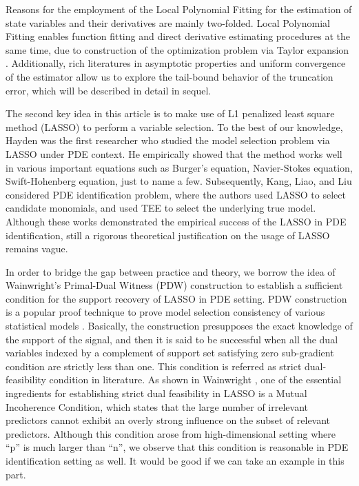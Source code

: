 \documentclass[a4paper,11pt]{article}
\begin{document}
Reasons for the employment of the Local Polynomial Fitting for the estimation of state variables and their derivatives are mainly two-folded. Local Polynomial Fitting enables function fitting and direct derivative estimating procedures at the same time, due to construction of the optimization problem via Taylor expansion \cite{fan1997local}. Additionally, rich literatures in asymptotic properties and uniform convergence of the estimator \cite{fan1997local,tusnady1977remark,mack1982weak} allow us to explore the tail-bound behavior of the truncation error, which will be described in detail in sequel. 

The second key idea in this article is to make use of L1 penalized least square method (LASSO) to perform a variable selection. To the best of our knowledge, Hayden \cite{schaeffer2017learning} was the first researcher who studied the model selection problem via LASSO under PDE context. He empirically showed that the method works well in various important equations such as Burger’s equation, Navier-Stokes equation, Swift-Hohenberg equation, just to name a few. Subsequently, Kang, Liao, and Liu \cite{kang2019ident} considered PDE identification problem, where the authors used LASSO to select candidate monomials, and used TEE to select the underlying true model. Although these works demonstrated the empirical success of the LASSO in PDE identification, still a rigorous theoretical justification on the usage of LASSO remains vague. 

In order to bridge the gap between practice and theory, we borrow the idea of Wainwright's Primal-Dual Witness (PDW) construction to establish a sufficient condition for the support recovery of LASSO in PDE setting. PDW construction is a popular proof technique to prove model selection consistency of various statistical models \cite{ravikumar2010high,ravikumar2009sparse,ravikumar2011high,obozinski2008union,wang2013block,jalali2010dirty,wainwright2009sharp}. Basically, the construction presupposes the exact knowledge of the support of the signal, and then it is said to be successful when all the dual variables indexed by a complement of support set satisfying zero sub-gradient condition are strictly less than one. This condition is referred as strict dual-feasibility condition in literature. As shown in Wainwright \cite{wainwright2009sharp}, one of the essential ingredients for establishing strict dual feasibility in LASSO is a Mutual Incoherence Condition, which states that the large number of irrelevant predictors cannot exhibit an overly strong influence on the subset of relevant predictors. Although this condition arose from high-dimensional setting where “p” is much larger than “n”, we observe that this condition is reasonable in PDE identification setting as well. It would be good if we can take an example in this part. 
\end{document}
